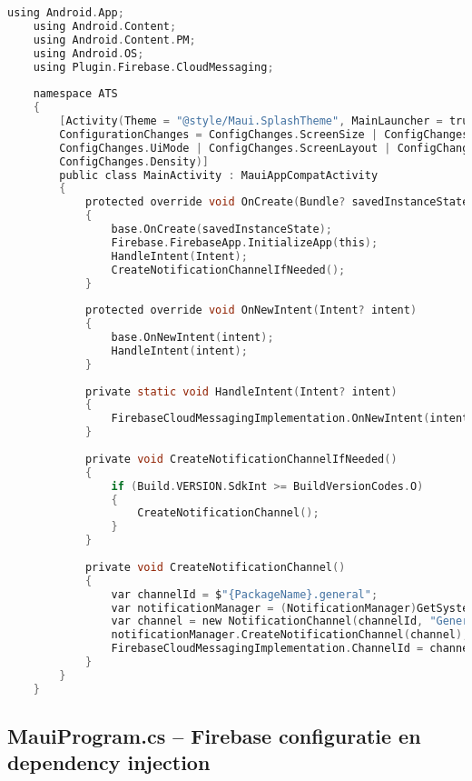 \begin{lstlisting}[language=C, caption=Android configuratie in MainActivity, label=lst:pushnotification-android]
    using Android.App;
    using Android.Content;
    using Android.Content.PM;
    using Android.OS;
    using Plugin.Firebase.CloudMessaging;
    
    namespace ATS
    {
        [Activity(Theme = "@style/Maui.SplashTheme", MainLauncher = true, LaunchMode = LaunchMode.SingleTop,
        ConfigurationChanges = ConfigChanges.ScreenSize | ConfigChanges.Orientation |
        ConfigChanges.UiMode | ConfigChanges.ScreenLayout | ConfigChanges.SmallestScreenSize |
        ConfigChanges.Density)]
        public class MainActivity : MauiAppCompatActivity
        {
            protected override void OnCreate(Bundle? savedInstanceState)
            {
                base.OnCreate(savedInstanceState);
                Firebase.FirebaseApp.InitializeApp(this);
                HandleIntent(Intent);
                CreateNotificationChannelIfNeeded();
            }
            
            protected override void OnNewIntent(Intent? intent)
            {
                base.OnNewIntent(intent);
                HandleIntent(intent);
            }
            
            private static void HandleIntent(Intent? intent)
            {
                FirebaseCloudMessagingImplementation.OnNewIntent(intent);
            }
            
            private void CreateNotificationChannelIfNeeded()
            {
                if (Build.VERSION.SdkInt >= BuildVersionCodes.O)
                {
                    CreateNotificationChannel();
                }
            }
            
            private void CreateNotificationChannel()
            {
                var channelId = $"{PackageName}.general";
                var notificationManager = (NotificationManager)GetSystemService(NotificationService);
                var channel = new NotificationChannel(channelId, "General", NotificationImportance.Default);
                notificationManager.CreateNotificationChannel(channel);
                FirebaseCloudMessagingImplementation.ChannelId = channelId;
            }
        }
    }
\end{lstlisting}

\subsection{MauiProgram.cs – Firebase configuratie en dependency injection}

